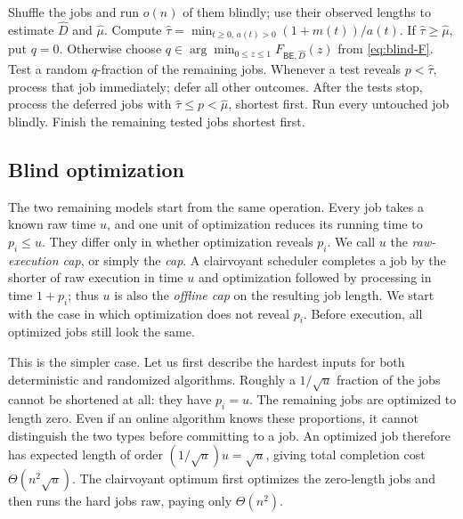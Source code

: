 \begin{algorithm}[H]
\caption{}
\label{alg:intro-blind}
\begin{algorithmic}
\State Shuffle the jobs and run $o(n)$ of them blindly; use their observed
lengths to estimate $\widehat D$ and $\widehat\mu$.
\State Compute
$\widehat\tau=\min_{t\ge0,\,a(t)>0}(1+m(t))/a(t)$.
\State If $\widehat\tau\ge\widehat\mu$, put $q=0$.  Otherwise choose
$q\in\arg\min_{0\le z\le1}F_{\mathsf{BE},\widehat D}(z)$ from \cref{eq:blind-F}. 
\State Test a random $q$-fraction of the remaining jobs.  Whenever a test
reveals $p<\widehat\tau$, process that job immediately; defer all other
outcomes.
\State After the tests stop, process the deferred jobs with
$\widehat\tau\le p<\widehat\mu$, shortest first.
\State Run every untouched job blindly.
\State Finish the remaining tested jobs shortest first.
\end{algorithmic}
\end{algorithm}

\subsection{Blind optimization}
\label{sec:intro-blind-optimization}

The two remaining models start from the same operation.  Every job takes a
known raw time $u$, and one unit of optimization reduces its running time to
$p_i\leq u$.  They differ only in whether optimization reveals $p_i$.  We
call $u$ the \emph{raw-execution cap}, or simply the \emph{cap}.  A
clairvoyant scheduler completes a job by the shorter of raw execution in
time $u$ and optimization followed by processing in time $1+p_i$; thus $u$
is also the \emph{offline cap} on the resulting job length.  We start with
the case in which optimization does not reveal $p_i$.  Before execution,
all optimized jobs still look the same.

This is the simpler case.  Let us first describe the hardest inputs for both
deterministic and randomized algorithms.  Roughly a $1/\sqrt u$ fraction of
the jobs cannot be shortened at all: they have $p_i=u$.  The remaining jobs
are optimized to length zero.  Even if an online algorithm knows these
proportions, it cannot distinguish the two types before committing to a job.
An optimized job therefore has expected length of order
$(1/\sqrt u)u=\sqrt u$, giving total completion cost
$\Theta(n^2\sqrt u)$.  The clairvoyant optimum first optimizes the zero-length
jobs and then runs the hard jobs raw, paying only $\Theta(n^2)$.

